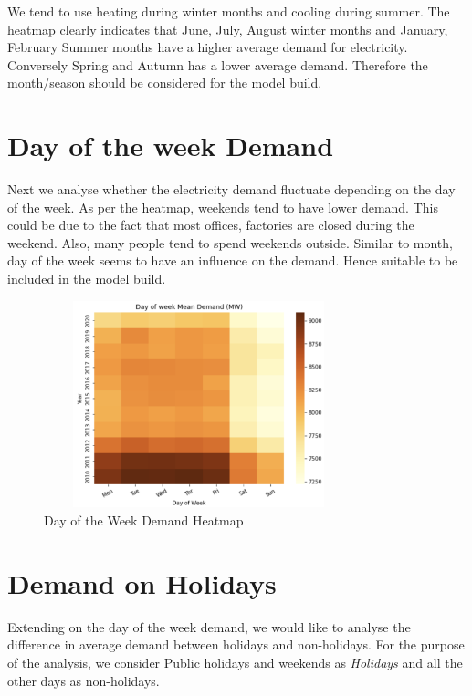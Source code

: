 \documentclass[mstat,12pt]{unswthesis}
\begin{document}
We tend to use heating during winter months and cooling during summer.
The heatmap clearly indicates that June, July, August winter months and
January, February Summer months have a higher average demand for
electricity. Conversely Spring and Autumn has a lower average demand.
Therefore the month/season should be considered for the model build.

\section{Day of the week Demand}\label{day-of-the-week-demand}

Next we analyse whether the electricity demand fluctuate depending on
the day of the week. As per the heatmap, weekends tend to have lower
demand. This could be due to the fact that most offices, factories are
closed during the weekend. Also, many people tend to spend weekends
outside. Similar to month, day of the week seems to have an influence on
the demand. Hence suitable to be included in the model build.

\begin{figure}[H]
\centering
\includegraphics[width=0.80\textwidth,height=6cm]{day_heat.png}
\caption{Day of the Week Demand Heatmap}
\label{day_heat}
\end{figure}

\section{Demand on Holidays}\label{demand-on-holidays}

Extending on the day of the week demand, we would like to analyse the
difference in average demand between holidays and non-holidays. For the
purpose of the analysis, we consider Public holidays and weekends as
\textit{Holidays} and all the other days as non-holidays.
\end{document}
